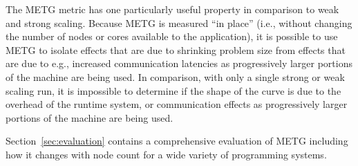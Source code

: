 The METG metric has one particularly useful property in comparison to
weak and strong scaling. Because METG is measured ``in place'' (i.e.,
without changing the number of nodes or cores available to the
application), it is possible to use METG to isolate effects that are
due to shrinking problem size from effects that are due to e.g.,
increased communication latencies as progressively larger portions of
the machine are being used. In comparison, with only a single strong
or weak scaling run, it is impossible to determine if the shape of the
curve is due to the overhead of the runtime system, or communication
effects as progressively larger portions of the machine are being
used.

Section~\ref{sec:evaluation} contains a comprehensive evaluation of
METG including how it changes with node count for a wide variety of
programming systems.

